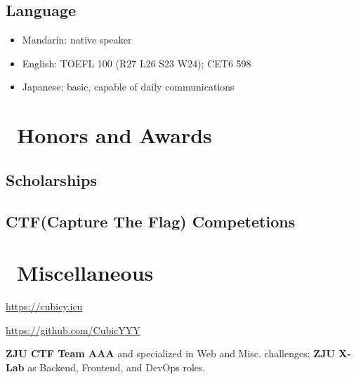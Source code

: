 \documentclass{resume}
\begin{document}
\subsection{Language}
\begin{itemize}[parsep=0.5ex]
  \item Mandarin: native speaker
  \item English: TOEFL 100 (R27 L26 S23 W24); CET6 598
  \item Japanese: basic, capable of daily communications
\end{itemize}

\section{\faHeartO\ Honors and Awards}
\subsection{Scholarships}

\subsection{CTF(Capture The Flag) Competetions}

\section{\faInfo\ Miscellaneous}
\begin{description}[parsep=0.5ex]
  \item[Personal Blog] \url{https://cubicy.icu}
  \item[GitHub] \url{https://github.com/CubicYYY}
  \item[Team Involvement] \textbf{ZJU CTF Team AAA} and specialized in Web and Misc. challenges; \textbf{ZJU X-Lab} as Backend, Frontend, and DevOps roles.
\end{description}

%
%
\end{document}
